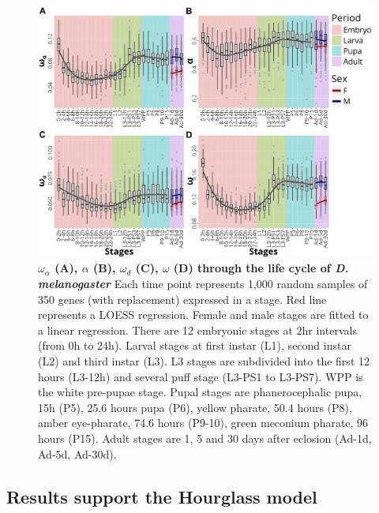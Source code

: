 \begin{figure}[t]
  \includegraphics[width=\textwidth]{./Images/Art-IV/OmegaA_lifecycle.png}
  \centering
  \caption{\textbf{ {\large$\omega_{\alpha}$} (A),  {\large$\alpha$} (B), {\large$\omega_{d}$} (C), {\large$\omega$} (D) through the life cycle of \textit{D. melanogaster}} Each time point represents 1,000 random samples of 350 genes (with replacement) expressed in a stage. Red line represents a LOESS regression. Female and male stages are fitted to a linear regression. There are 12 embryonic stages at 2hr intervals (from 0h to 24h). Larval stages at first instar (L1), second instar (L2) and third instar (L3). L3 stages are subdivided into the first 12 hours (L3-12h) and several puff stage (L3-PS1 to L3-PS7). WPP is the white pre-pupae stage. Pupal stages are phanerocephalic pupa, 15h (P5), 25.6 hours pupa (P6), yellow pharate, 50.4 hours (P8), amber eye-pharate, 74.6 hours (P9-10), green meconium pharate, 96 hours (P15). Adult stages are 1, 5 and 30 days after eclosion (Ad-1d, Ad-5d, Ad-30d).
  }
  \label{fig:Art-IV-OmegaA_lifecycle}
\end{figure}

\subsection{Results support the Hourglass model}

